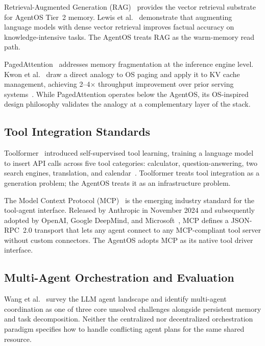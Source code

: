\documentclass[journal]{IEEEtran}
\begin{document}
Retrieval-Augmented Generation (RAG)~\cite{lewis2020rag} provides the vector retrieval substrate for AgentOS Tier~2 memory. Lewis et al.~\cite{lewis2020rag} demonstrate that augmenting language models with dense vector retrieval improves factual accuracy on knowledge-intensive tasks. The AgentOS treats RAG as the warm-memory read path.

PagedAttention~\cite{kwon2023vllm} addresses memory fragmentation at the inference engine level. Kwon et al.~\cite{kwon2023vllm} draw a direct analogy to OS paging and apply it to KV cache management, achieving 2--4$\times$ throughput improvement over prior serving systems~\cite{kwon2023vllm}. While PagedAttention operates below the AgentOS, its OS-inspired design philosophy validates the analogy at a complementary layer of the stack.

\subsection{Tool Integration Standards}

Toolformer~\cite{schick2023toolformer} introduced self-supervised tool learning, training a language model to insert API calls across five tool categories: calculator, question-answering, two search engines, translation, and calendar~\cite{schick2023toolformer}. Toolformer treats tool integration as a generation problem; the AgentOS treats it as an infrastructure problem.

The Model Context Protocol (MCP)~\cite{anthropic2024mcp} is the emerging industry standard for the tool-agent interface. Released by Anthropic in November 2024 and subsequently adopted by OpenAI, Google DeepMind, and Microsoft~\cite{anthropic2024mcp}, MCP defines a JSON-RPC~2.0 transport that lets any agent connect to any MCP-compliant tool server without custom connectors. The AgentOS adopts MCP as its native tool driver interface.

\subsection{Multi-Agent Orchestration and Evaluation}

Wang et al.~\cite{wang2023survey} survey the LLM agent landscape and identify multi-agent coordination as one of three core unsolved challenges alongside persistent memory and task decomposition. Neither the centralized nor decentralized orchestration paradigm specifies how to handle conflicting agent plans for the same shared resource.
\end{document}
